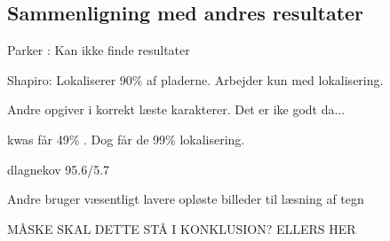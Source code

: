 \subsection{Sammenligning med andres resultater}
Parker : Kan ikke finde resultater

Shapiro: Lokaliserer 90\% af pladerne. Arbejder kun med lokalisering.

Andre opgiver i korrekt læste karakterer. Det er ike godt da... \cite{nijhuis}

kwas får 49\% . Dog får de 99\% lokalisering.

dlagnekov 95.6/5.7

Andre bruger væsentligt lavere opløste billeder til læsning af tegn

MÅSKE SKAL DETTE STÅ I KONKLUSION? ELLERS HER
